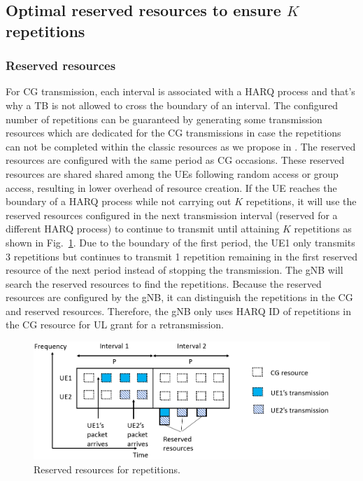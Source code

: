 \documentclass{ieeeaccess}
\begin{document}
\subsection{Optimal reserved resources to ensure $K$ repetitions}\label{IIIB}

\subsubsection {Reserved resources}

For CG transmission, each interval is associated with a HARQ process and that's why a TB is not allowed to cross the boundary of an interval. The configured number of repetitions can be guaranteed by generating some transmission resources which are dedicated for the CG transmissions in case the repetitions can not be completed within the classic resources as we propose in \cite{b9}. The reserved resources are configured with the same period as CG occasions. These reserved resources are shared shared among the UEs following random access or group access, resulting in lower overhead of resource creation. If the UE reaches the boundary of a HARQ process while not carrying out $K$ repetitions, it will use the reserved resources configured in the next transmission interval (reserved for a different HARQ process) to continue to transmit until attaining $K$ repetitions as shown in Fig.~\ref{fig5}. Due to the boundary of the first period, the UE1 only transmits 3 repetitions but continues to transmit 1 repetition remaining in the first reserved resource of the next period instead of stopping the transmission. The gNB will search the reserved resources to find the repetitions. Because the reserved resources are configured by the gNB, it can distinguish the repetitions in the CG and reserved resources. Therefore, the gNB only uses HARQ ID of repetitions in the CG resource for UL grant for a retransmission.

\begin{figure}[htbp]
\centerline{\includegraphics[scale=0.32]{fig5.PNG}}
\caption{Reserved resources for repetitions.}
\label{fig5}
\vspace{-2mm}
\end{figure}
\end{document}
